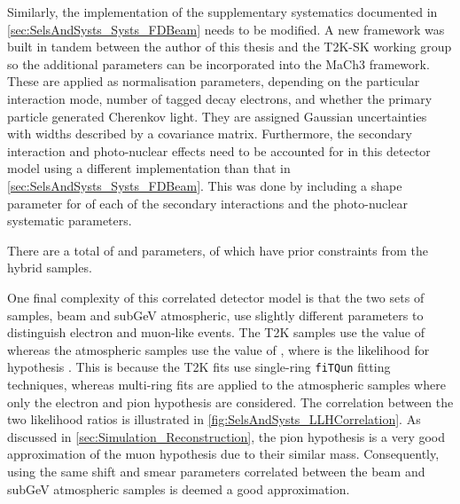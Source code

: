 Similarly, the implementation of the supplementary systematics documented in \autoref{sec:SelsAndSysts_Systs_FDBeam} needs to be modified. A new framework \cite{t2ksk-common} was built in tandem between the author of this thesis and the T2K-SK working group \cite{t2k_tn_399} so the additional parameters can be incorporated into the MaCh3 framework. These are applied as normalisation parameters, depending on the particular interaction mode, number of tagged decay electrons, and whether the primary particle generated Cherenkov light. They are assigned Gaussian uncertainties with widths described by a covariance matrix. Furthermore, the secondary interaction and photo-nuclear effects need to be accounted for in this detector model using a different implementation than that in \autoref{sec:SelsAndSysts_Systs_FDBeam}. This was done by including a shape parameter for of each of the secondary interactions and the photo-nuclear systematic parameters.

There are a total of   and  parameters, of which  have prior constraints from the hybrid  samples.

One final complexity of this correlated detector model is that the two sets of samples, beam and subGeV atmospheric, use slightly different parameters to distinguish electron and muon-like events. The T2K samples use the value of  whereas the atmospheric samples use the value of , where  is the likelihood for hypothesis . This is because the T2K fits use single-ring \texttt{fiTQun} fitting techniques, whereas multi-ring fits are applied to the atmospheric samples where only the electron and pion hypothesis are considered. The correlation between the two likelihood ratios is illustrated in \autoref{fig:SelsAndSysts_LLHCorrelation}. As discussed in \autoref{sec:Simulation_Reconstruction}, the pion hypothesis is a very good approximation of the muon hypothesis due to their similar mass. Consequently, using the same shift and smear parameters correlated between the beam and subGeV atmospheric samples is deemed a good approximation.

